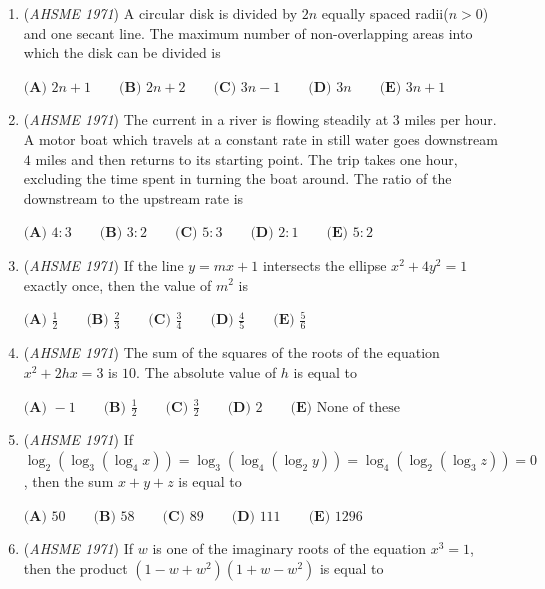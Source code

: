 \begin{enumerate}
 $\textbf{(A) }1:1\qquad \textbf{(B) }35:36\qquad \textbf{(C) }36:35\qquad \textbf{(D) }2:1\qquad  \textbf{(E) }\text{None of these}$


	\item (\textit{AHSME 1971}) A circular disk is divided by $2n$ equally spaced radii($n>0$) and one secant line. The maximum number of non-overlapping 
areas into which the disk can be divided is


 $\textbf{(A) }2n+1\qquad \textbf{(B) }2n+2\qquad \textbf{(C) }3n-1\qquad \textbf{(D) }3n\qquad  \textbf{(E) }3n+1$


	\item (\textit{AHSME 1971}) The current in a river is flowing steadily at $3$ miles per hour. A motor boat which travels at a constant rate in still 
water goes downstream $4$ miles and then returns to its starting point. The trip takes one hour, excluding the time spent 
in turning the boat around. The ratio of the downstream to the upstream rate is 


 $\textbf{(A) }4:3\qquad \textbf{(B) }3:2\qquad \textbf{(C) }5:3\qquad \textbf{(D) }2:1\qquad  \textbf{(E) }5:2$


	\item (\textit{AHSME 1971}) If the line $y=mx+1$ intersects the ellipse $x^2+4y^2=1$ exactly once, then the value of $m^2$ is


 $\textbf{(A) }\textstyle\frac{1}{2}\qquad \textbf{(B) }\frac{2}{3}\qquad \textbf{(C) }\frac{3}{4}\qquad \textbf{(D) }\frac{4}{5}\qquad \textbf{(E) }\frac{5}{6}$


	\item (\textit{AHSME 1971}) The sum of the squares of the roots of the equation $x^2+2hx=3$ is $10$. The absolute value of $h$ is equal to


 $\textbf{(A) }-1\qquad \textbf{(B) }\textstyle\frac{1}{2}\qquad \textbf{(C) }\textstyle\frac{3}{2}\qquad \textbf{(D) }2\qquad \textbf{(E) }\text{None of these}$


	\item (\textit{AHSME 1971}) If $\log_2(\log_3(\log_4 x))=\log_3(\log_4(\log_2 y))=\log_4(\log_2(\log_3 z))=0$, then the sum $x+y+z$ is equal to


 $\textbf{(A) }50\qquad \textbf{(B) }58\qquad \textbf{(C) }89\qquad \textbf{(D) }111\qquad  \textbf{(E) }1296$


	\item (\textit{AHSME 1971}) If $w$ is one of the imaginary roots of the equation $x^3=1$, then the product $(1-w+w^2)(1+w-w^2)$ is equal to



\end{enumerate}

